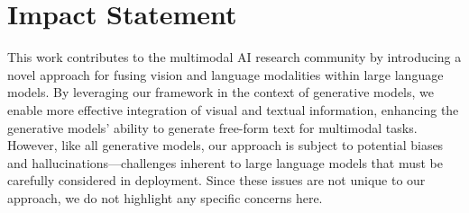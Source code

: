 
\section*{Impact Statement}
This work contributes to the multimodal AI research community by introducing a novel approach for fusing vision and language modalities within large language models. By leveraging our framework in the context of generative models, we enable more effective integration of visual and textual information, enhancing the generative models' ability to generate free-form text for multimodal tasks. However, like all generative models, our approach is subject to potential biases and hallucinations—challenges inherent to large language models that must be carefully considered in deployment. Since these issues are not unique to our approach, we do not highlight any specific concerns here.
